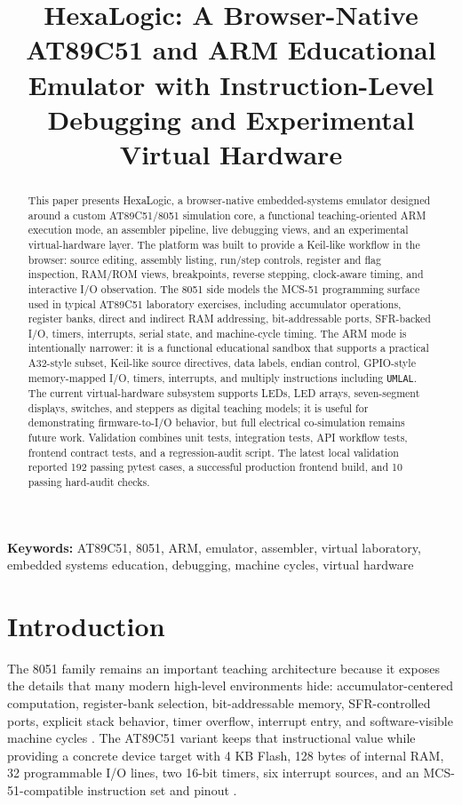 \documentclass[conference]{IEEEtran}
\title{HexaLogic: A Browser-Native AT89C51 and ARM Educational Emulator with Instruction-Level Debugging and Experimental Virtual Hardware}
\author{
\IEEEauthorblockN{Ashwinder Pal Singh}
\IEEEauthorblockA{
HexaLogic Project\\
Browser-Based Embedded Systems Laboratory\\
}
}
\date{}
\newenvironment{IEEEkeywords}{\par\noindent\textbf{Keywords: }}{\par}
\begin{document}
\maketitle

\begin{abstract}
This paper presents HexaLogic, a browser-native embedded-systems emulator designed around a custom AT89C51/8051 simulation core, a functional teaching-oriented ARM execution mode, an assembler pipeline, live debugging views, and an experimental virtual-hardware layer. The platform was built to provide a Keil-like workflow in the browser: source editing, assembly listing, run/step controls, register and flag inspection, RAM/ROM views, breakpoints, reverse stepping, clock-aware timing, and interactive I/O observation. The 8051 side models the MCS-51 programming surface used in typical AT89C51 laboratory exercises, including accumulator operations, register banks, direct and indirect RAM addressing, bit-addressable ports, SFR-backed I/O, timers, interrupts, serial state, and machine-cycle timing. The ARM mode is intentionally narrower: it is a functional educational sandbox that supports a practical A32-style subset, Keil-like source directives, data labels, endian control, GPIO-style memory-mapped I/O, timers, interrupts, and multiply instructions including \texttt{UMLAL}. The current virtual-hardware subsystem supports LEDs, LED arrays, seven-segment displays, switches, and steppers as digital teaching models; it is useful for demonstrating firmware-to-I/O behavior, but full electrical co-simulation remains future work. Validation combines unit tests, integration tests, API workflow tests, frontend contract tests, and a regression-audit script. The latest local validation reported 192 passing pytest cases, a successful production frontend build, and 10 passing hard-audit checks.
\end{abstract}

\begin{IEEEkeywords}
AT89C51, 8051, ARM, emulator, assembler, virtual laboratory, embedded systems education, debugging, machine cycles, virtual hardware
\end{IEEEkeywords}

\section{Introduction}
The 8051 family remains an important teaching architecture because it exposes the details that many modern high-level environments hide: accumulator-centered computation, register-bank selection, bit-addressable memory, SFR-controlled ports, explicit stack behavior, timer overflow, interrupt entry, and software-visible machine cycles \cite{intel_mcs51,mazidi_8051}. The AT89C51 variant keeps that instructional value while providing a concrete device target with 4 KB Flash, 128 bytes of internal RAM, 32 programmable I/O lines, two 16-bit timers, six interrupt sources, and an MCS-51-compatible instruction set and pinout \cite{atmel_at89c51}.
\end{document}
